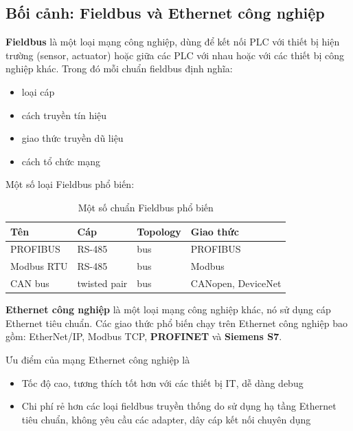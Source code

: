 \documentclass[../main.tex]{subfiles}
\begin{document}
\subsection{Bối cảnh: Fieldbus và Ethernet công nghiệp}

\textbf{Fieldbus}  là một loại mạng công nghiệp, dùng để kết nối PLC với thiết bị hiện trường (sensor, actuator) hoặc giữa các PLC với nhau hoặc với các thiết bị công nghiệp khác. Trong đó mỗi chuẩn fieldbus định nghĩa:

\begin{itemize}
    \item loại cáp
    \item cách truyền tín hiệu
    \item giao thức truyền dũ liệu
    \item cách tổ chức mạng
\end{itemize}

Một số loại Fieldbus phổ biến:


\begin{table}[H]
    \centering
    \caption{Một số chuẩn Fieldbus phổ biến}
    \label{tab:fieldbus}
    \footnotesize
    \begin{tabular}{|l|l|l|l|}
        \hline
        \textbf{Tên} & \textbf{Cáp} & \textbf{Topology} & \textbf{Giao thức} \\
        \hline
        PROFIBUS & RS-485 & bus & PROFIBUS \\
        \hline
        Modbus RTU & RS-485 & bus & Modbus \\
        \hline
        CAN bus & twisted pair & bus & CANopen, DeviceNet \\
        \hline
    \end{tabular}
\end{table}

\textbf{Ethernet công nghiệp}  là một loại mạng công nghiệp khác, nó sử dụng cáp Ethernet tiêu chuẩn. Các giao thức phổ biến chạy trên Ethernet công nghiệp bao gồm: EtherNet/IP, Modbus TCP, \textbf{PROFINET} và \textbf{Siemens S7}. 

Ưu điểm của mạng Ethernet công nghiệp là

\begin{itemize}
    \item Tốc độ cao, tương thích tốt hơn với các thiết bị IT, dễ dàng debug
    \item Chi phí rẻ hơn các loại fieldbus truyền thống do sử dụng hạ tầng Ethernet tiêu chuẩn, không yêu cầu các adapter, dây cáp kết nối chuyên dụng
\end{itemize}
\end{document}
